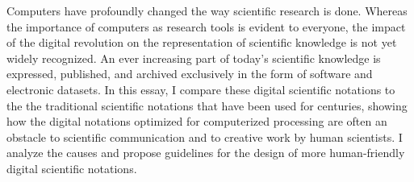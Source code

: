 Computers have profoundly changed the way scientific research is done. Whereas the importance of computers as research tools is evident to everyone, the impact of the digital revolution on the representation of scientific knowledge is not yet widely recognized. An ever increasing part of today's scientific knowledge is expressed, published, and archived exclusively in the form of software and electronic datasets.  In this essay, I compare these digital scientific notations to the the traditional scientific notations that have been used for centuries, showing how the digital notations optimized for computerized processing are often an obstacle to scientific communication and to creative work by human scientists. I analyze the causes and propose guidelines for the design of more human-friendly digital scientific notations.

